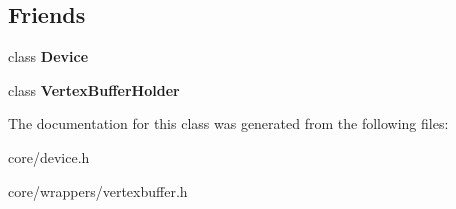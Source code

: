 \subsection*{Friends}
\begin{DoxyCompactItemize}
\item 
\hypertarget{class_tempest_1_1_vertex_buffer_a520fa05e0bf58785da428f7a0241eee2}{class {\bfseries Device}}\label{class_tempest_1_1_vertex_buffer_a520fa05e0bf58785da428f7a0241eee2}

\item 
\hypertarget{class_tempest_1_1_vertex_buffer_a8f2a3cd0c6cd4d5675f10b94ff00271e}{class {\bfseries Vertex\+Buffer\+Holder}}\label{class_tempest_1_1_vertex_buffer_a8f2a3cd0c6cd4d5675f10b94ff00271e}

\end{DoxyCompactItemize}


The documentation for this class was generated from the following files\+:\begin{DoxyCompactItemize}
\item 
core/device.\+h\item 
core/wrappers/vertexbuffer.\+h\end{DoxyCompactItemize}

